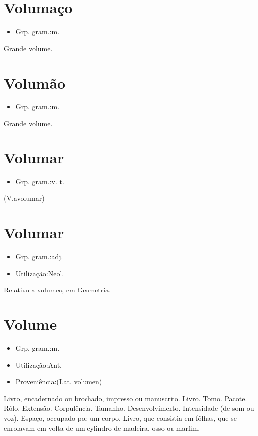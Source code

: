 \documentclass{article}
\begin{document}
\section{Volumaço}
\begin{itemize}
\item {Grp. gram.:m.}
\end{itemize}
Grande volume.
\section{Volumão}
\begin{itemize}
\item {Grp. gram.:m.}
\end{itemize}
Grande volume.
\section{Volumar}
\begin{itemize}
\item {Grp. gram.:v. t.}
\end{itemize}
(V.avolumar)
\section{Volumar}
\begin{itemize}
\item {Grp. gram.:adj.}
\end{itemize}
\begin{itemize}
\item {Utilização:Neol.}
\end{itemize}
Relativo a volumes, em Geometria.
\section{Volume}
\begin{itemize}
\item {Grp. gram.:m.}
\end{itemize}
\begin{itemize}
\item {Utilização:Ant.}
\end{itemize}
\begin{itemize}
\item {Proveniência:(Lat. \textunderscore volumen\textunderscore )}
\end{itemize}
Livro, encadernado ou brochado, impresso ou manuscrito.
Livro.
Tomo.
Pacote.
Rôlo.
Extensão.
Corpulência.
Tamanho.
Desenvolvimento.
Intensidade (de som ou voz).
Espaço, occupado por um corpo.
Livro, que consistia em fôlhas, que se enrolavam em volta de um cylindro de madeira, osso ou marfim.
\end{document}
